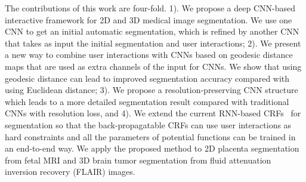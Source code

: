 \documentclass[10pt,journal,compsoc]{IEEEtran}
\begin{document}
The contributions of this work are four-fold. 1). We propose a deep CNN-based interactive framework for 2D and 3D medical image segmentation. %
We use one CNN to get an initial automatic segmentation, which is refined by another CNN that takes as input the initial segmentation and user interactions; 
2). We present a new way to combine user interactions with CNNs based on geodesic distance maps that are used as extra channels of the input for CNNs. 
We show that using geodesic distance can lead to improved segmentation accuracy compared with using Euclidean distance; 3). We propose a resolution-preserving CNN structure which leads to a more detailed segmentation result compared with traditional CNNs with resolution loss, and 4). We extend the current RNN-based CRFs~\cite{Zheng2015a} for segmentation so that the back-propagatable CRFs can use user interactions as hard constraints and all the parameters of potential functions can be trained in an end-to-end way. We apply the proposed method to 2D placenta segmentation from fetal MRI and 3D brain tumor segmentation from fluid attenuation inversion recovery (FLAIR) images.
 
 



%
%
\end{document}
